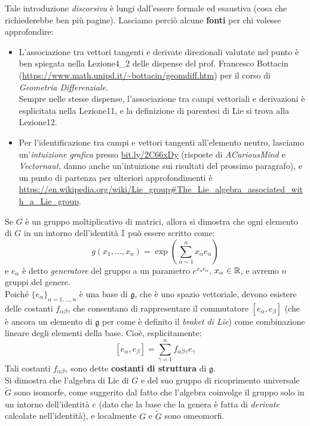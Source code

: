\documentclass[../../FisicaTeorica.tex]{subfiles}
\begin{document}
\begin{expl}
Tale introduzione \textit{discorsiva} è lungi dall'essere formale ed esaustiva (cosa che richiederebbe ben più pagine). Lasciamo perciò alcune \textbf{fonti} per chi volesse approfondire:
\begin{itemize}
\item L'associazione tra vettori tangenti e derivate direzionali valutate nel punto è ben spiegata nella Lezione4\_2 delle dispense del prof. Francesco Bottacin (\url{https://www.math.unipd.it/~bottacin/geomdiff.htm}) per il corso di \textit{Geometria Differenziale}.\\
Sempre nelle stesse dispense, l'associazione tra campi vettoriali e derivazioni è esplicitata nella Lezione11, e la definizione di parentesi di Lie si trova alla Lezione12. \item Per l'identificazione tra campi e vettori tangenti all'elemento neutro, lasciamo un'\textit{intuizione grafica} presso \url{bit.ly/2C66xDy} (risposte di \textit{ACuriousMind} e \textit{Vectornaut}, danno anche un'intuizione sui risultati del prossimo paragrafo), e un punto di partenza per ulteriori approfondimenti è \url{https://en.wikipedia.org/wiki/Lie_group#The_Lie_algebra_associated_with_a_Lie_group}.  
\end{itemize}
\end{expl}

Se $G$ è un gruppo moltiplicativo di matrici, allora si dimostra che ogni elemento di $G$ in un intorno dell'identità $\mathbb{I}$ può essere scritto come:
\begin{equation}
g(x_1,\dots,x_n)=
\exp\left({\sum_{\alpha=1}^n}x_\alpha e_\alpha\right)
\label{eqn:mappa-esponenziale-multivariata}
\end{equation}
e $e_\alpha$ è detto \textit{generatore} del gruppo a un parametro $e^{x_\alpha e_\alpha}$, $x_\alpha \in \mathbb{R}$, e avremo $n$ gruppi del genere.\\
Poiché $\{e_\alpha\}_{\alpha=1,\dots,n}$ è una base di $\mathfrak{g}$, che è uno spazio vettoriale, devono esistere delle costanti $f_{\alpha \beta \gamma}$ che consentano di rappresentare il commutatore $[e_\alpha, e_\beta]$ (che è ancora un elemento di $\mathfrak{g}$ per come è definito il \textit{braket di Lie}) come combinazione lineare degli elementi della base. Cioè, esplicitamente:
\[
[e_\alpha, e_\beta] = \sum_{\gamma=1}^n f_{\alpha \beta \gamma} e_\gamma
\]
Tali costanti $f_{\alpha \beta \gamma}$ sono dette \textbf{costanti di struttura} di $\mathfrak{g}$.\\

Si dimostra che l'algebra di Lie di $G$ e del suo gruppo di ricoprimento universale $\tilde{G}$ sono isomorfe, come suggerito dal fatto che l'algebra coinvolge il gruppo solo in un intorno dell'identità $e$ (dato che la base che la genera è fatta di \textit{derivate} calcolate nell'identità), e localmente $G$ e $\tilde{G}$ sono omeomorfi.\\
\end{document}
